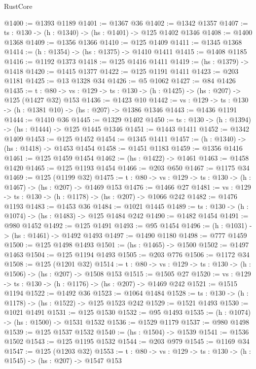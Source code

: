 \begin{lexlean}{RustCore}
\begin{coremodule}
@1400 := @1393 @1189
@1401 := @1367 @36
@1402 := @1342 @1357
@1407 := {ts : @130} -> (h : @1340) -> (hs : @1401) -> @125 @1402 @1346
@1408 := @1400 @1368
@1409 := @1356 @1366
@1410 := @125 @1409
@1411 := @1345 @1368
@1414 := (h : @1354) -> (hs : @1375) -> @1410 @1411
@1415 := @1408 @1185
@1416 := @1192 @1373
@1418 := @125 @1416 @1411
@1419 := (hs : @1379) -> @1418
@1420 := @1415 @1377
@1422 := @125 @1191 @1411
@1423 := @203 @1181
@1425 := @13 @1328 @34
@1426 := @5 @1062
@1427 := @84 @1426
@1435 := {t : @80} ->
  {vs : @129} -> {ts : @130} -> (h : @1425) -> (hs : @207) -> @125 (@1427 @32) @153
@1436 := @1423 @10
@1442 := {vs : @129} -> {ts : @130} -> (h : @1381 @10) -> (hs : @207) -> @1386 @1346
@1443 := @1436 @1191
@1444 := @1410 @36
@1445 := @1329 @1402
@1450 := {ts : @130} -> (h : @1394) -> (hs : @1444) -> @125 @1445 @1346
@1451 := @1443 @1411
@1452 := @1342 @1409
@1453 := @125 @1452
@1454 := @1345 @1411
@1457 := (h : @1340) -> (hs : @1418) -> @1453 @1454
@1458 := @1451 @1183
@1459 := @1356 @1416
@1461 := @125 @1459 @1454
@1462 := (hs : @1422) -> @1461
@1463 := @1458 @1420
@1465 := @125 @1193 @1454
@1466 := @203 @650
@1467 := @1175 @34
@1469 := @125 (@1199 @32)
@1475 := {t : @80} -> {vs : @129} -> {ts : @130} -> (h : @1467) -> (hs : @207) -> @1469 @153
@1476 := @1466 @27
@1481 := {vs : @129} -> {ts : @130} -> (h : @1178) -> (hs : @207) -> @1066 @242
@1482 := @1476 @1193
@1483 := @1453 @36
@1484 := @1021 @1445
@1489 := {ts : @130} -> (h : @1074) -> (hs : @1483) -> @125 @1484 @242
@1490 := @1482 @1454
@1491 := @980 @1452
@1492 := @125 @1491
@1493 := @95 @1454
@1496 := (h : @1031) -> (hs : @1461) -> @1492 @1493
@1497 := @1490 @1180
@1498 := @777 @1459
@1500 := @125 @1498 @1493
@1501 := (hs : @1465) -> @1500
@1502 := @1497 @1463
@1504 := @125 @1194 @1493
@1505 := @203 @776
@1506 := @1172 @34
@1508 := @125 (@1201 @32)
@1514 := {t : @80} -> {vs : @129} -> {ts : @130} -> (h : @1506) -> (hs : @207) -> @1508 @153
@1515 := @1505 @27
@1520 := {vs : @129} -> {ts : @130} -> (h : @1176) -> (hs : @207) -> @1469 @242
@1521 := @1515 @1194
@1522 := @1492 @36
@1523 := @1064 @1484
@1528 := {ts : @130} -> (h : @1178) -> (hs : @1522) -> @125 @1523 @242
@1529 := @1521 @1493
@1530 := @1021 @1491
@1531 := @125 @1530
@1532 := @95 @1493
@1535 := (h : @1074) -> (hs : @1500) -> @1531 @1532
@1536 := @1529 @1179
@1537 := @980 @1498
@1539 := @125 @1537 @1532
@1540 := (hs : @1504) -> @1539
@1541 := @1536 @1502
@1543 := @125 @1195 @1532
@1544 := @203 @979
@1545 := @1169 @34
@1547 := @125 (@1203 @32)
@1553 := {t : @80} -> {vs : @129} -> {ts : @130} -> (h : @1545) -> (hs : @207) -> @1547 @153

\end{coremodule}
\end{lexlean}
